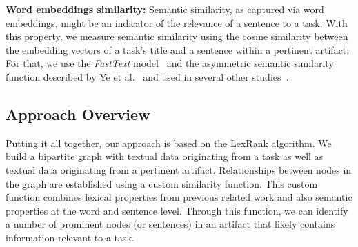 \vspace{3mm}
\begin{hangparas}{1em}{1}
    \textbf{Word embeddings similarity:} Semantic similarity, as captured via word embeddings, might be an indicator of the relevance of a sentence to a task. With this property, we measure semantic similarity using the cosine similarity between the embedding vectors of a task's title and a sentence within a pertinent artifact. 
    For that, we use the \textit{FastText} model~\cite{bojanowski2017FastText} and the asymmetric semantic similarity function described by Ye et al.~\cite{Ye2016} and used in several other studies~\cite{silva2019, Huang2018, Xu2017}.
\end{hangparas}




\clearpage

\subsection{Approach Overview}


Putting it all together, our approach is based on the LexRank algorithm.
We build a bipartite graph with textual data originating from a task as well as textual data originating from a pertinent artifact.
Relationships between nodes in the graph are established using a custom similarity function.
This custom function combines lexical properties from previous related work 
and also semantic properties at the word and sentence level.
Through this function, we can identify a number of prominent nodes (or sentences)
in an artifact that likely contains information relevant to a task.


